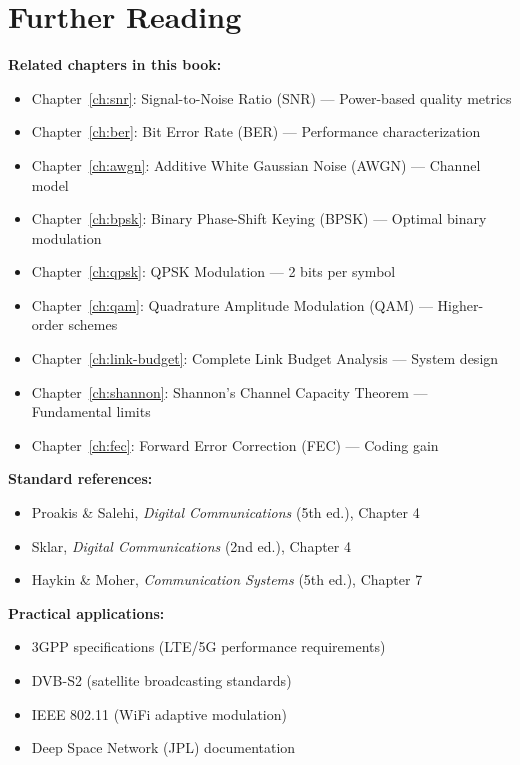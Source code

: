 \section{Further Reading}

\textbf{Related chapters in this book:}
\begin{itemize}
\item Chapter~\ref{ch:snr}: Signal-to-Noise Ratio (SNR) --- Power-based quality metrics
\item Chapter~\ref{ch:ber}: Bit Error Rate (BER) --- Performance characterization
\item Chapter~\ref{ch:awgn}: Additive White Gaussian Noise (AWGN) --- Channel model
\item Chapter~\ref{ch:bpsk}: Binary Phase-Shift Keying (BPSK) --- Optimal binary modulation
\item Chapter~\ref{ch:qpsk}: QPSK Modulation --- 2 bits per symbol
\item Chapter~\ref{ch:qam}: Quadrature Amplitude Modulation (QAM) --- Higher-order schemes
\item Chapter~\ref{ch:link-budget}: Complete Link Budget Analysis --- System design
\item Chapter~\ref{ch:shannon}: Shannon's Channel Capacity Theorem --- Fundamental limits
\item Chapter~\ref{ch:fec}: Forward Error Correction (FEC) --- Coding gain
\end{itemize}

\textbf{Standard references:}
\begin{itemize}
\item Proakis \& Salehi, \textit{Digital Communications} (5th ed.), Chapter 4
\item Sklar, \textit{Digital Communications} (2nd ed.), Chapter 4
\item Haykin \& Moher, \textit{Communication Systems} (5th ed.), Chapter 7
\end{itemize}

\textbf{Practical applications:}
\begin{itemize}
\item 3GPP specifications (LTE/5G performance requirements)
\item DVB-S2 (satellite broadcasting standards)
\item IEEE 802.11 (WiFi adaptive modulation)
\item Deep Space Network (JPL) documentation
\end{itemize}
